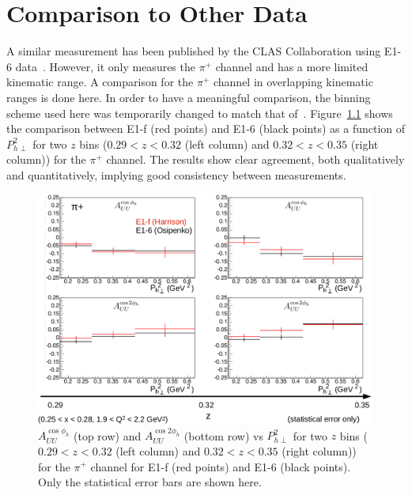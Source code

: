 \chapter{Comparison to Other Data}
\label{cha:Comparison}

A similar measurement has been published by the CLAS Collaboration using \mbox{E1-6} data~\cite{Osipenko09}.
However, it only measures the $\pi^+$ channel and has a more limited kinematic range.
A comparison for the $\pi^+$ channel in overlapping kinematic ranges is done here.
In order to have a meaningful comparison, the binning scheme used here was temporarily changed to match that of~\cite{Osipenko09}.
Figure~\ref{fig:osipenkoComparisonVPT2_2zBins} shows the comparison between E1-f (red points) and E1-6 (black points) as a function of $P_{h\perp}^2$ for two $z$ bins ($0.29 < z < 0.32$ (left column) and $0.32 < z < 0.35$ (right column)) for the $\pi^+$ channel.
The results show clear agreement, both qualitatively and quantitatively, implying good consistency between measurements.
%
\begin{figure}
\centering
\includegraphics[width=8.5in]{figures/osipenkoComparisonVPT2_2zBins.png}
\caption{$A_{UU}^{\cos \phi_h}$ (top row) and $A_{UU}^{\cos 2\phi_h}$ (bottom row) vs $P_{h\perp}^2$ for two $z$ bins ($0.29 < z < 0.32$ (left column) and $0.32 < z < 0.35$ (right column)) for the $\pi^+$ channel for E1-f (red points) and E1-6 (black points). Only the statistical error bars are shown here.}
\label{fig:osipenkoComparisonVPT2_2zBins}
\end{figure}
%
\clearpage

